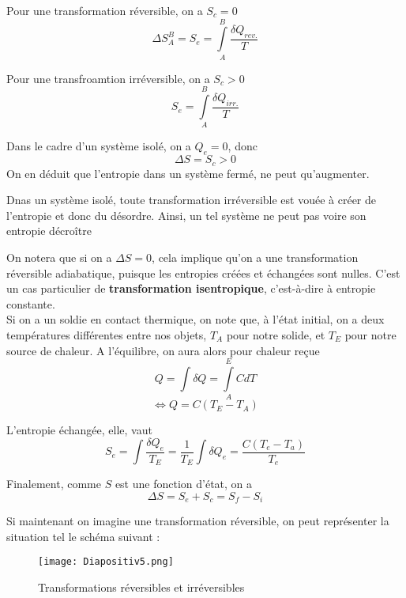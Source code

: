 Pour une transformation réversible, on a $S_c=0$
\begin{equation}
\Delta S_A^B=S_e=\int \limits_A^B \frac{\delta Q_{rev.}}{T}
\end{equation}

Pour une transfroamtion irréversible, on a $S_c>0$
\begin{equation}
S_e=\int \limits_A^B \frac{\delta Q_{irr.}}{T}
\end{equation}

Dans le cadre d'un système isolé, on a $Q_e=0$, donc
\begin{equation}
\Delta S = S_c >0
\end{equation}
On en déduit que l'entropie dans un système fermé, ne peut qu'augmenter.\\

\begin{proposition}
Dnas un système isolé, toute transformation irréversible est vouée à créer de l'entropie et donc du désordre. Ainsi, un tel système ne peut pas voire son entropie décroître
\end{proposition}

On notera que si on a $\Delta S=0$, cela implique qu'on a une transformation réversible adiabatique, puisque les entropies créées et échangées sont nulles. C'est un cas particulier de \textbf{transformation isentropique}, c'est-à-dire à entropie constante.\\

Si on a un soldie en contact thermique, on note que, à l'état initial, on a deux températures différentes entre nos objets, $T_A$ pour notre solide, et $T_E$ pour notre source de chaleur. A l'équilibre, on aura alors pour chaleur reçue
$$Q=\int \delta Q = \int \limits_A^E CdT$$
$$\Leftrightarrow Q = C(T_E-T_A)$$

L'entropie échangée, elle, vaut
$$S_e=\int \frac{\delta Q_e}{T_E}=\frac{1}{T_E}\int \delta Q_e=\frac{C(T_e-T_a)}{T_e}$$

Finalement, comme $S$ est une fonction d'état, on a
$$\Delta S = S_e + S_c = S_f-S_i$$

Si maintenant on imagine une transformation réversible, on peut représenter la situation tel le schéma suivant :

\begin{figure}[H]
\centering
\texttt{[image: Diapositiv5.png]}
\caption{Transformations réversibles et irréversibles}
\end{figure}


